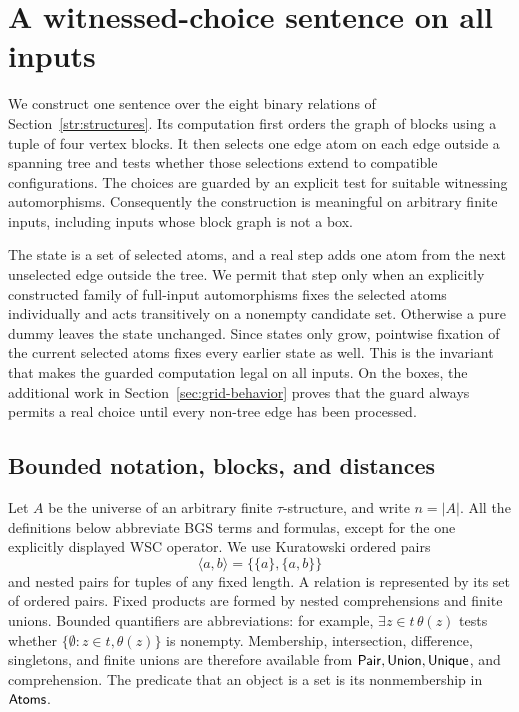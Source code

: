 \section{A witnessed-choice sentence on all inputs}\label{sec:sentence}

We construct one sentence over the eight binary relations of
Section~\ref{str:structures}. Its computation first orders the graph of
blocks using a tuple of four vertex blocks. It then selects one edge atom
on each edge outside a spanning tree and tests whether those selections
extend to compatible configurations. The choices are guarded by an
explicit test for suitable witnessing automorphisms. Consequently the
construction is meaningful on arbitrary finite inputs, including inputs
whose block graph is not a box.

The state is a set of selected atoms, and a real step adds one atom from
the next unselected edge outside the tree. We permit that step only when
an explicitly constructed family of full-input automorphisms fixes the
selected atoms individually and acts transitively on a nonempty candidate set.
Otherwise a pure dummy leaves the state unchanged. Since states only
grow, pointwise fixation of the current selected atoms fixes every
earlier state as well. This is the invariant that makes the guarded
computation legal on all inputs. On the boxes, the additional work in
Section~\ref{sec:grid-behavior} proves that the guard always permits a
real choice until every non-tree edge has been processed.

\subsection{Bounded notation, blocks, and distances}

Let \(A\) be the universe of an arbitrary finite \(\tau\)-structure, and
write \(n=|A|\). All the definitions below abbreviate BGS terms and
formulas, except for the one explicitly displayed WSC operator. We use
Kuratowski ordered pairs
\[
 \langle a,b\rangle=\{\{a\},\{a,b\}\}
\]
and nested pairs for tuples of any fixed length. A relation is represented
by its set of ordered pairs. Fixed products are formed by nested
comprehensions and finite unions. Bounded quantifiers are abbreviations:
for example, \(\exists z\in t\,\theta(z)\) tests whether
\(\{\emptyset:z\in t,\theta(z)\}\) is nonempty. Membership, intersection,
difference, singletons, and finite unions are therefore available from
\(\mathsf{Pair},\mathsf{Union},\mathsf{Unique}\), and comprehension. The predicate that an object
is a set is its nonmembership in \(\mathsf{Atoms}\).

